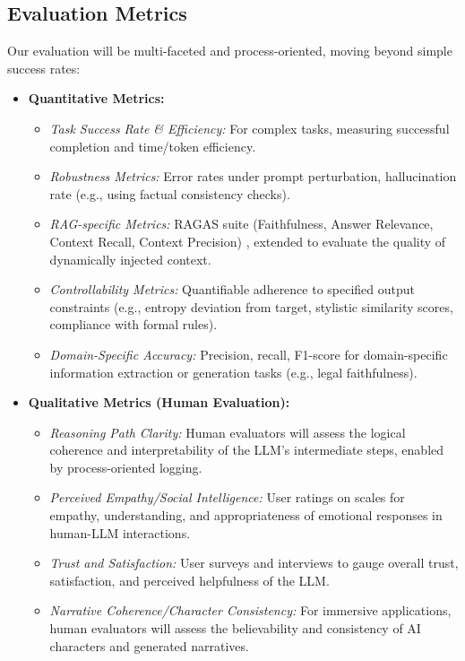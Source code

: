 \documentclass{article}
\begin{document}
\subsection{Evaluation Metrics}
Our evaluation will be multi-faceted and process-oriented, moving beyond simple success rates:
\begin{itemize}
    \item \textbf{Quantitative Metrics:}
    \begin{itemize}
        \item \textit{Task Success Rate \& Efficiency:} For complex tasks, measuring successful completion and time/token efficiency.
        \item \textit{Robustness Metrics:} Error rates under prompt perturbation, hallucination rate (e.g., using factual consistency checks).
        \item \textit{RAG-specific Metrics:} RAGAS suite (Faithfulness, Answer Relevance, Context Recall, Context Precision) \citep{paper5}, extended to evaluate the quality of dynamically injected context.
        \item \textit{Controllability Metrics:} Quantifiable adherence to specified output constraints (e.g., entropy deviation from target, stylistic similarity scores, compliance with formal rules).
        \item \textit{Domain-Specific Accuracy:} Precision, recall, F1-score for domain-specific information extraction or generation tasks (e.g., legal faithfulness).
    \end{itemize}
    \item \textbf{Qualitative Metrics (Human Evaluation):}
    \begin{itemize}
        \item \textit{Reasoning Path Clarity:} Human evaluators will assess the logical coherence and interpretability of the LLM's intermediate steps, enabled by process-oriented logging.
        \item \textit{Perceived Empathy/Social Intelligence:} User ratings on scales for empathy, understanding, and appropriateness of emotional responses in human-LLM interactions.
        \item \textit{Trust and Satisfaction:} User surveys and interviews to gauge overall trust, satisfaction, and perceived helpfulness of the LLM.
        \item \textit{Narrative Coherence/Character Consistency:} For immersive applications, human evaluators will assess the believability and consistency of AI characters and generated narratives.
    \end{itemize}
\end{itemize}
\end{document}
